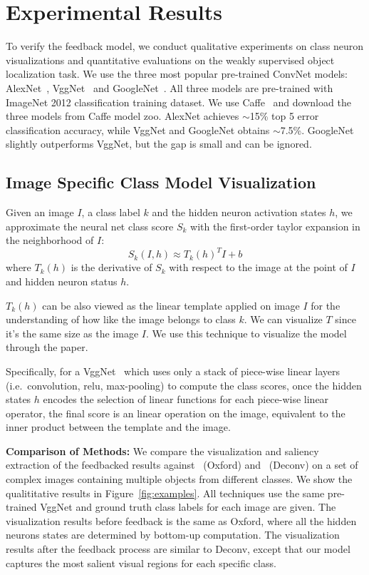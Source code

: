 \section{Experimental Results}
\label{sec:experiment}

To verify the feedback model, we conduct qualitative experiments on class neuron visualizations and quantitative evaluations on the weakly supervised object localization task. We use the three most popular pre-trained ConvNet models: AlexNet~\cite{Krizhevsky2012ImageNet}, VggNet~\cite{simonyan2013deep} and GoogleNet~\cite{Szegedy2014Going}. All three models are pre-trained with ImageNet 2012 classification training dataset. We use Caffe~\cite{jia2014caffe} and download the three models from Caffe model zoo. AlexNet achieves $\sim$15\% top 5 error classification accuracy, while VggNet and GoogleNet obtains $\sim$7.5\%. GoogleNet slightly outperforms VggNet, but the gap is small and can be ignored. 

\subsection{Image Specific Class Model Visualization}
\label{subsec:visualization}
Given an image $I$, a class label $k$ and the hidden neuron activation states $h$, we approximate the neural net class score $S_k$ with the first-order taylor expansion in the neighborhood of $I$:
\begin{equation}
  S_k(I, h) \approx  T_k(h)^T I + b
\end{equation}
where $T_k(h)$ is the derivative of $S_k$ with respect to the image at the point of $I$ and hidden neuron status $h$.

$T_k(h)$ can be also viewed as the linear template applied on image $I$ for the understanding of how like the image belongs to class $k$. We can visualize $T$ since it's the same size as the image $I$. We use this technique to visualize the model through the paper.

Specifically, for a VggNet~\cite{Simonyan2014Very} which uses only a stack of piece-wise linear layers (i.e.\ convolution, relu, max-pooling) to compute the class scores, once the hidden states $h$ encodes the selection of linear functions for each piece-wise linear operator, the final score is an linear operation on the image, equivalent to the inner product between the template and the image.

\textbf{Comparison of Methods:} We compare the visualization and saliency extraction of the feedbacked results against~\cite{simonyan2013deep} (Oxford) and~\cite{zeiler2014visualizing} (Deconv) on a set of complex images containing multiple objects from different classes. We show the qualititative results in Figure~\ref{fig:examples}. All techniques use the same pre-trained VggNet\cite{Simonyan2014Very} and ground truth class labels for each image are given. The visualization results before feedback is the same as Oxford, where all the hidden neurons states are determined by bottom-up computation. The visualization results after the feedback process are similar to Deconv, except that our model captures the most salient visual regions for each specific class. 


